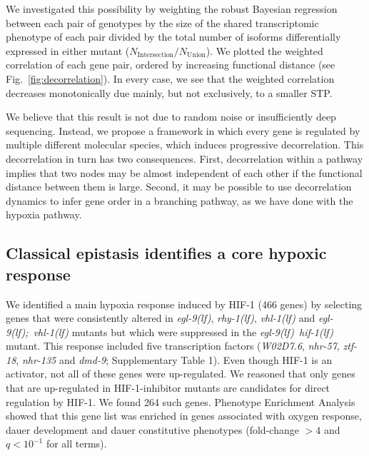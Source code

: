 \documentclass[9pt,twocolumn,twoside]{pnas-new}
\newcommand{\qval}[1]{$q<10^{-#1}$}
\newcommand{\gene}[1]{\mbox{\emph{#1}}}
\newcommand{\nhr}{\gene{nhr-57}}
\newcommand{\egl}{\gene{egl-9(lf)}}
\newcommand{\rhy}{\gene{rhy-1(lf)}}
\newcommand{\vhl}{\gene{vhl-1(lf)}}
\newcommand{\eglvhl}{\gene{egl-9(lf); vhl-1(lf)}}
\newcommand{\eglhif}{\gene{egl-9(lf) hif-1(lf)}}
\newcommand{\hifp}{HIF-1}
\newcommand{\hiftargets}{264}
\begin{document}
We investigated this possibility by weighting the robust Bayesian regression
between each pair of genotypes by the size of the shared transcriptomic
phenotype of each pair divided by the total number of isoforms differentially
expressed in either mutant ($N_\mathrm{Intersection}/N_{\mathrm{Union}}$). We
plotted the weighted correlation of each gene pair, ordered by increasing
functional distance (see Fig.~\ref{fig:decorrelation}). In every case, we see
that the weighted correlation decreases monotonically due mainly, but not
exclusively, to a smaller STP.

We believe that this result is not due to random noise or insufficiently deep
sequencing. Instead, we propose a framework in which every gene is regulated by
multiple different molecular species, which induces progressive decorrelation.
This decorrelation in turn has two consequences. First, decorrelation within a
pathway implies that two nodes may be almost independent of each other if the
functional distance between them is large. Second, it may be possible to use
decorrelation dynamics to infer gene order in a branching pathway, as we have
done with the hypoxia pathway.

\subsection{Classical epistasis identifies a core hypoxic response}
We identified a main hypoxia response induced by \hifp{} (466 genes) by
selecting genes that were consistently altered in \egl{}, \rhy{}, \vhl{} and
\eglvhl{} mutants but which were suppressed in the \eglhif{} mutant. This
response included five transcription factors (\gene{W02D7.6}, \nhr{},
\gene{ztf-18}, \gene{nhr-135} and \gene{dmd-9}; Supplementary Table 1). Even
though \hifp{} is an activator, not all of these genes were up-regulated. We
reasoned that only genes that are up-regulated in \hifp{}-inhibitor mutants are
candidates for direct regulation by \hifp{}. We found \hiftargets{} such genes.
Phenotype Enrichment Analysis~\cite{Angeles-Albores106369} showed that this gene
list was enriched in genes associated with oxygen response, dauer development
and dauer constitutive phenotypes (fold-change $>4$ and \qval{1} for all terms).
\end{document}
